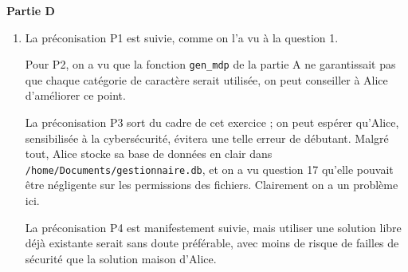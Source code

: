 \documentclass[11pt,a4paper]{article}
\newcommand{\mip}[1]{\texttt{#1}}
\newcommand{\mib}[1]{\texttt{#1}}
\begin{document}
\bigskip

\textbf{Partie D}



\begin{enumerate}[resume]
\item La préconisation P1 est suivie, comme on l'a vu à la question 1.

Pour P2, on a vu que la fonction \mip{gen_mdp} de la partie A ne garantissait pas que chaque catégorie de caractère serait utilisée, on peut conseiller à Alice d'améliorer ce point.

La préconisation P3 sort du cadre de cet exercice ; on peut espérer qu'Alice, sensibilisée à la cybersécurité, évitera une telle erreur de débutant. Malgré tout, Alice stocke sa base de données en clair dans \mib{/home/Documents/gestionnaire.db}, et on a vu question 17 qu'elle pouvait être négligente sur les permissions des fichiers. Clairement on a un problème ici.


La préconisation P4 est manifestement suivie, mais utiliser une solution libre déjà existante serait sans doute préférable, avec moins de risque de failles de sécurité que la solution \og maison \fg{} d'Alice.




\end{enumerate}
\end{document}
